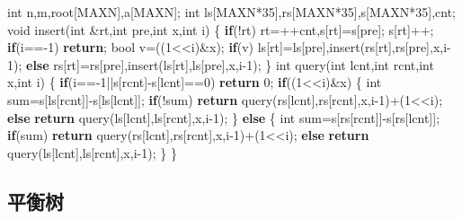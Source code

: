 \documentclass[
]{article}
\newenvironment{Shaded}{}{}
\newcommand{\ControlFlowTok}[1]{\textcolor[rgb]{0.00,0.44,0.13}{\textbf{#1}}}
\newcommand{\DataTypeTok}[1]{\textcolor[rgb]{0.56,0.13,0.00}{#1}}
\newcommand{\DecValTok}[1]{\textcolor[rgb]{0.25,0.63,0.44}{#1}}
\newcommand{\NormalTok}[1]{#1}
\begin{document}
\begin{Shaded}
\begin{Highlighting}[]
\DataTypeTok{int}\NormalTok{ n,m,root[MAXN],a[MAXN];}
\DataTypeTok{int}\NormalTok{ ls[MAXN*}\DecValTok{35}\NormalTok{],rs[MAXN*}\DecValTok{35}\NormalTok{],s[MAXN*}\DecValTok{35}\NormalTok{],cnt;}
\DataTypeTok{void}\NormalTok{ insert(}\DataTypeTok{int}\NormalTok{ \&rt,}\DataTypeTok{int}\NormalTok{ pre,}\DataTypeTok{int}\NormalTok{ x,}\DataTypeTok{int}\NormalTok{ i)}
\NormalTok{\{}
    \ControlFlowTok{if}\NormalTok{(!rt) rt=++cnt,s[rt]=s[pre]; s[rt]++;}
    \ControlFlowTok{if}\NormalTok{(i=={-}}\DecValTok{1}\NormalTok{) }\ControlFlowTok{return}\NormalTok{;}
    \DataTypeTok{bool}\NormalTok{ v=((}\DecValTok{1}\NormalTok{\textless{}\textless{}i)\&x);}
    \ControlFlowTok{if}\NormalTok{(v) ls[rt]=ls[pre],insert(rs[rt],rs[pre],x,i{-}}\DecValTok{1}\NormalTok{);}
    \ControlFlowTok{else}\NormalTok{ rs[rt]=rs[pre],insert(ls[rt],ls[pre],x,i{-}}\DecValTok{1}\NormalTok{);}
\NormalTok{\}}
\DataTypeTok{int}\NormalTok{ query(}\DataTypeTok{int}\NormalTok{ lcnt,}\DataTypeTok{int}\NormalTok{ rcnt,}\DataTypeTok{int}\NormalTok{ x,}\DataTypeTok{int}\NormalTok{ i)}
\NormalTok{\{}
    \ControlFlowTok{if}\NormalTok{(i=={-}}\DecValTok{1}\NormalTok{||s[rcnt]{-}s[lcnt]==}\DecValTok{0}\NormalTok{) }\ControlFlowTok{return} \DecValTok{0}\NormalTok{;}
    \ControlFlowTok{if}\NormalTok{((}\DecValTok{1}\NormalTok{\textless{}\textless{}i)\&x)}
\NormalTok{    \{}
        \DataTypeTok{int}\NormalTok{ sum=s[ls[rcnt]]{-}s[ls[lcnt]];}
        \ControlFlowTok{if}\NormalTok{(!sum) }\ControlFlowTok{return}\NormalTok{ query(rs[lcnt],rs[rcnt],x,i{-}}\DecValTok{1}\NormalTok{)+(}\DecValTok{1}\NormalTok{\textless{}\textless{}i);}
        \ControlFlowTok{else} \ControlFlowTok{return}\NormalTok{ query(ls[lcnt],ls[rcnt],x,i{-}}\DecValTok{1}\NormalTok{);}
\NormalTok{    \}}
    \ControlFlowTok{else}
\NormalTok{    \{}
        \DataTypeTok{int}\NormalTok{ sum=s[rs[rcnt]]{-}s[rs[lcnt]];}
        \ControlFlowTok{if}\NormalTok{(sum) }\ControlFlowTok{return}\NormalTok{ query(rs[lcnt],rs[rcnt],x,i{-}}\DecValTok{1}\NormalTok{)+(}\DecValTok{1}\NormalTok{\textless{}\textless{}i);}
        \ControlFlowTok{else} \ControlFlowTok{return}\NormalTok{ query(ls[lcnt],ls[rcnt],x,i{-}}\DecValTok{1}\NormalTok{);}
\NormalTok{    \}}
\NormalTok{\}}
\end{Highlighting}
\end{Shaded}

\hypertarget{ux5e73ux8861ux6811}{%
\subsection{平衡树}\label{ux5e73ux8861ux6811}}
\end{document}

